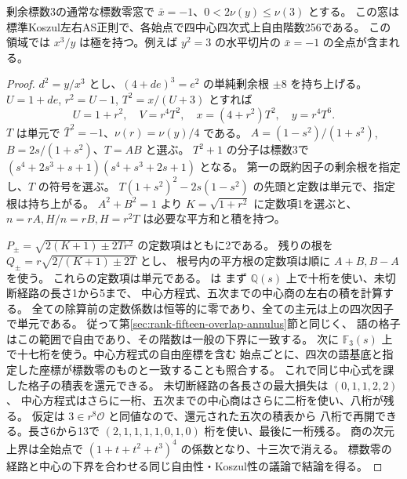 \begin{theorem}\label{thm:rank-fifteen-pole-slope-annulus}
剰余標数3の通常な標数零窓で $\bar x=-1$、$0<2\nu(y)\le\nu(3)$ とする。
この窓は標準Koszul左右AS正則で、各始点で四中心四次式上自由階数256である。
この領域では $x^3/y$ は極を持つ。例えば $y^2=3$ の水平切片の $\bar x=-1$ の全点が含まれる。
\end{theorem}
\begin{proof}
$d^2=y/x^3$ とし、$(4+de)^3=e^2$ の単純剰余根 $\pm8$ を持ち上げる。
$U=1+de$, $r^2=U-1$, $T^2=x/(U+3)$ とすれば
\[
    U=1+r^2,\quad V=r^4 T^2,\quad x=(4+r^2)T^2,\quad y=r^4 T^6.
\]
$T$ は単元で $\bar T^2=-1$、$\nu(r)=\nu(y)/4$ である。
$A=(1-s^2)/(1+s^2)$, $B=2s/(1+s^2)$、$T=AB$ と選ぶ。
$T^2+1$ の分子は標数3で
$(s^4+2s^3+s+1)(s^4+s^3+2s+1)$ となる。
第一の既約因子の剰余根を指定し、$T$ の符号を選ぶ。
$T(1+s^2)^2-2s(1-s^2)$ の先頭と定数は単元で、指定根は持ち上がる。
$A^2+B^2=1$ より $K=\sqrt{1+r^2}$ に定数項1を選ぶと、
$n=rA,H/n=rB,H=r^2T$ は必要な平方和と積を持つ。

$P_\pm=\sqrt{2(K+1)\pm2Tr^2}$ の定数項はともに2である。
残りの根を $Q_\pm=r\sqrt{2/(K+1)\pm2T}$ とし、
根号内の平方根の定数項は順に $A+B,B-A$ を使う。
これらの定数項は単元である。
 は
まず $\mathbb Q(s)$ 上で十桁を使い、未切断経路の長さ1から5まで、
中心方程式、五次までの中心商の左右の積を計算する。
全ての除算前の定数係数は恒等的に零であり、全ての主元は上の四次因子で単元である。
従って第\ref{sec:rank-fifteen-overlap-annulus}節と同じく、
語の格子はこの範囲で自由であり、その階数は一般の下界に一致する。
次に $\mathbb F_3(s)$ 上で十七桁を使う。中心方程式の自由座標を含む
始点ごとに、四次の語基底と指定した座標が標数零のものと一致することも照合する。
これで同じ中心式を課した格子の積表を還元できる。
未切断経路の各長さの最大損失は $(0,1,1,2,2)$、
中心方程式はさらに一桁、五次までの中心商はさらに二桁を使い、八桁が残る。
仮定は $3\in r^8\mathcal O$ と同値なので、還元された五次の積表から
八桁で再開できる。長さ6から13で $(2,1,1,1,1,0,1,0)$ 桁を使い、最後に一桁残る。
商の次元上界は全始点で $(1+t+t^2+t^3)^4$ の係数となり、十三次で消える。
標数零の経路と中心の下界を合わせる同じ自由性・Koszul性の議論で結論を得る。
\end{proof}
